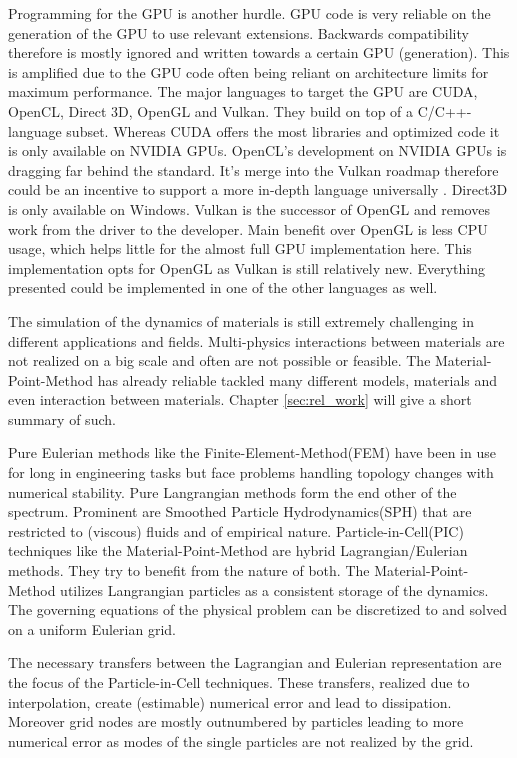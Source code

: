 \documentclass[m,times]{cgMA}
\begin{document}
Programming for the GPU is another hurdle. GPU code is very reliable on the generation of the GPU to use relevant extensions. Backwards compatibility therefore is mostly ignored and written towards a certain GPU (generation). This is amplified due to the GPU code often being reliant on architecture limits for maximum performance. The major languages to target the GPU are CUDA, OpenCL, Direct 3D, OpenGL and Vulkan. They build on top of a C/C++-language subset. Whereas CUDA offers the most libraries and optimized code it is only available on NVIDIA GPUs. OpenCL's development on NVIDIA GPUs is dragging far behind the standard. It's merge into the Vulkan roadmap therefore could be an incentive to support a more in-depth language universally \cite{OPENCL:ROADMAP}. Direct3D is only available on Windows. Vulkan is the successor of OpenGL and removes work from the driver to the developer. Main benefit over OpenGL is less CPU usage, which helps little for the almost full GPU implementation here. This implementation opts for OpenGL as Vulkan is still relatively new. Everything presented could be implemented in one of the other languages as well.

The simulation of the dynamics of materials is still extremely challenging in different applications and fields. Multi-physics interactions between materials are not realized on a big scale and often are not possible or feasible. The Material-Point-Method has already reliable tackled many different models, materials and even interaction between materials. Chapter \ref{sec:rel_work} will give a short summary of such.

Pure Eulerian methods like the Finite-Element-Method(FEM) have been in use for long in engineering tasks but face problems handling topology changes with numerical stability. Pure Langrangian methods form the end other of the spectrum. Prominent are Smoothed Particle Hydrodynamics(SPH) that are restricted to (viscous) fluids and of empirical nature. Particle-in-Cell(PIC) techniques like the Material-Point-Method are hybrid Lagrangian/Eulerian methods. They try to benefit from the nature of both. The Material-Point-Method utilizes Langrangian particles as a consistent storage of the dynamics. The governing equations of the physical problem can be discretized to and solved on a uniform Eulerian grid.

The necessary transfers between the Lagrangian and Eulerian representation are the focus of the Particle-in-Cell techniques. These transfers, realized due to interpolation, create (estimable) numerical error and lead to dissipation. Moreover grid nodes are mostly outnumbered by particles leading to more numerical error as modes of the single particles are not realized by the grid.
\end{document}
